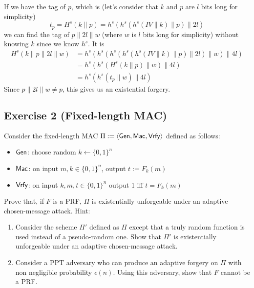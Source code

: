 \medskip
\begin{solution}
  If we have the tag of $p$, which is (let's consider that $k$ and $p$ are $l$ bits long for simplicity)
  \[ t_p = H^s(k\|p) = h^s(h^s(h^s(IV \| k) \| p) \| 2l) \]
  we can find the tag of $p\|2l\|w$ (where $w$ is $l$ bits long for simplicity)
  without knowing $k$ since we know $h^s$.
  It is
  \begin{align*}
    H^s(k\|p\|2l\|w)
    & = h^s(h^s(h^s(h^s(h^s(IV \| k) \| p) \| 2l) \| w) \| 4l)\\
    & = h^s(h^s(H^s(k \| p) \| w) \| 4l)\\
    & = h^s(h^s(t_p \| w) \| 4l)
  \end{align*}
  Since $p\|2l\|w \neq p$, this gives us an existential forgery.
\end{solution}

\subsection{Exercise 2 (Fixed-length MAC)}
Consider the fixed-length MAC $\Pi:=\langle\operatorname{\mathsf{Gen}},\operatorname{\mathsf{Mac}},\operatorname{\mathsf{Vrfy}}\rangle$
defined as follows:
\medskip
\begin{itemize}
  \item $\operatorname{\mathsf{Gen}}$: choose random $k\leftarrow \{0,1\}^n$  \smallskip
  \item $\operatorname{\mathsf{Mac}}$: on input $m,k \in\{0,1\}^n$, output $t:=F_k(m)$  \smallskip
  \item $\operatorname{\mathsf{Vrfy}}$: on input $k, m, t \in \{0,1\}^n$ output 1 iff $t=F_k(m)$
\end{itemize}
\medskip
%
Prove that, if $F$ is a PRF, $\Pi$ is existentially unforgeable under
an adaptive chosen-message attack. Hint:
\medskip
%
\begin{enumerate}
  \item Consider the scheme $\Pi'$ defined as $\Pi$ except that a truly
        random function is used instead of a pseudo-random one. Show that
        $\Pi'$ is existentially unforgeable under an adaptive chosen-message
        attack.  \smallskip
  \item Consider a PPT adversary who can produce an adaptive forgery on
        $\Pi$ with non negligible probability $\epsilon(n)$. Using this
        adversary, show that $F$ cannot be a PRF.
\end{enumerate}

